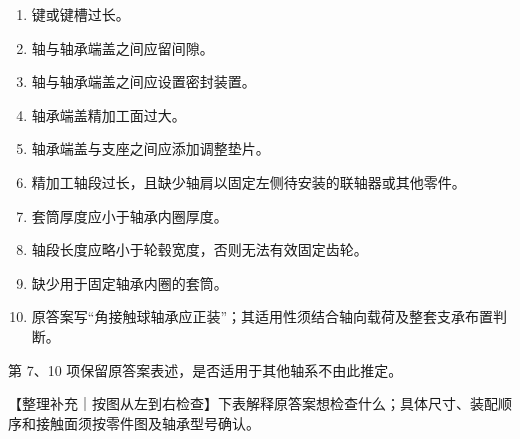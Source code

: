 \documentclass[zihao=5,a4paper,UTF8,fontset=fandol]{ctexart}
\begin{document}
\begin{enumerate}
\item 
键或键槽过长。


\item 
轴与轴承端盖之间应留间隙。


\item 
轴与轴承端盖之间应设置密封装置。


\item 
轴承端盖精加工面过大。


\item 
轴承端盖与支座之间应添加调整垫片。


\item 
精加工轴段过长，且缺少轴肩以固定左侧待安装的联轴器或其他零件。


\item 
套筒厚度应小于轴承内圈厚度。


\item 
轴段长度应略小于轮毂宽度，否则无法有效固定齿轮。


\item 
缺少用于固定轴承内圈的套筒。


\item 
原答案写“角接触球轴承应正装”；其适用性须结合轴向载荷及整套支承布置判断。



\end{enumerate}

第 7、10 项保留原答案表述，是否适用于其他轴系不由此推定。


【整理补充｜按图从左到右检查】下表解释原答案想检查什么；具体尺寸、装配顺序和接触面须按零件图及轴承型号确认。
\end{document}
